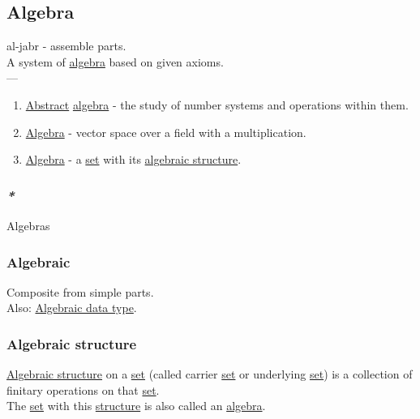 \documentclass[11pt]{article}
\begin{document}
\subsection{\label{orgecfec51}Algebra}
\label{sec:orga0683b2}
al-jabr - assemble parts.\\
A system of \hyperref[orgecfec51]{algebra} based on given axioms.\\

---\\

\begin{enumerate}
\item \hyperref[orgbbe9132]{Abstract} \hyperref[orgecfec51]{algebra} - the study of number systems and operations within them.\\
\item \hyperref[orgecfec51]{Algebra} - vector space over a field with a multiplication.\\
\item \hyperref[orgecfec51]{Algebra} - a \hyperref[org1faf06d]{set} with its \hyperref[org2ee73e8]{algebraic structure}.\\
\end{enumerate}

\subsubsection{\emph{*}}
\label{sec:org30fe325}

\label{org908535d}Algebras\\

\subsubsection{\label{orge9081c5}Algebraic}
\label{sec:orgf2b58fc}
Composite from simple parts.\\
Also: \hyperref[org2278a14]{Algebraic data type}.\\

\subsubsection{\label{org2ee73e8}Algebraic structure}
\label{sec:org7c9df55}
\hyperref[org2ee73e8]{Algebraic structure} on a \hyperref[org1faf06d]{set} (called carrier \hyperref[org1faf06d]{set} or underlying \hyperref[org1faf06d]{set}) is a collection of finitary operations on that \hyperref[org1faf06d]{set}.\\
The \hyperref[org1faf06d]{set} with this \hyperref[org8051f61]{structure} is also called an \hyperref[orgecfec51]{algebra}.\\
\end{document}
